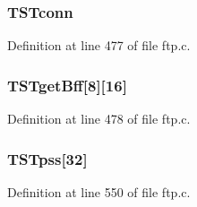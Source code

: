 \hypertarget{group__ftp_ga5bd0454c64c2b49ff7cf27c99cecfb20}{
\subsubsection[{TSTconn}]{ {\bf TSTconn}}}
\label{group__ftp_ga5bd0454c64c2b49ff7cf27c99cecfb20}


Definition at line 477 of file ftp.c.

\hypertarget{group__ftp_ga0e7de78898fdbc58c399ac2d2393477c}{
\subsubsection[{TSTgetBff}]{ {\bf TSTgetBff}\mbox{[}8\mbox{]}\mbox{[}16\mbox{]}}}
\label{group__ftp_ga0e7de78898fdbc58c399ac2d2393477c}


Definition at line 478 of file ftp.c.

\hypertarget{group__ftp_ga9d42b63fb0cdaa1f62de8ede515a5b71}{
\subsubsection[{TSTpss}]{ {\bf TSTpss}\mbox{[}32\mbox{]}}}
\label{group__ftp_ga9d42b63fb0cdaa1f62de8ede515a5b71}


Definition at line 550 of file ftp.c.

